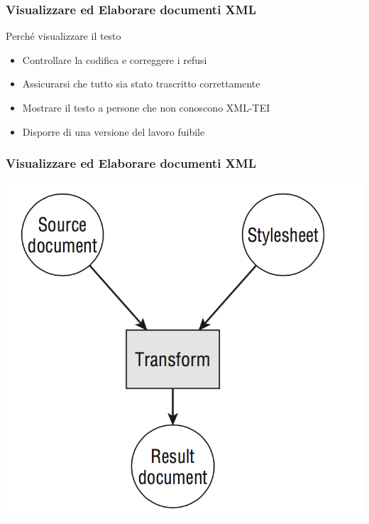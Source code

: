 \begin{frame}
    \frametitle{Visualizzare ed Elaborare documenti XML}
    \addtocounter{nframe}{1}
    

     \begin{block}{Perché visualizzare il testo}
         \begin{itemize}
            \item  Controllare la codifica e correggere i refusi
             \item Assicurarsi che tutto sia stato trascritto correttamente
             \item Mostrare il testo a persone che non conoscono XML-TEI
             \item Disporre di una versione del lavoro fuibile
        \end{itemize}
     \end{block}
    
\end{frame}

\begin{frame}
    \frametitle{Visualizzare ed Elaborare documenti XML}
    \addtocounter{nframe}{1}
    
    \begin{center}
        \includegraphics[width=.9\textwidth]{imgs/SchemaXSLTprocessing.png}
    \end{center}

\end{frame}

